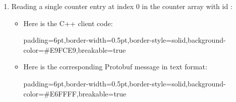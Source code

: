 \documentclass[11pt]{article}
\begin{document}
{%
\begin{enumerate}%

\item{}
Reading a single counter entry at index 0 in the counter array with id
:%

\begin{itemize}[noitemsep,topsep=\mdcompacttopsep]%

\item{}Here is the C++ client code:

\begin{mdbmargintb}{6pt}{6pt}%
\begin{mdblock}{padding=6pt,border-width=0.5pt,border-style=solid,background-color=\#E9FCE9,breakable=true}%
\begin{mdpre}%
\end{mdpre}%
\end{mdblock}%
\end{mdbmargintb}%

\item{}Here is the corresponding Protobuf message in text format:

\begin{mdbmargintb}{6pt}{6pt}%
\begin{mdblock}{padding=6pt,border-width=0.5pt,border-style=solid,background-color=\#E6FFFF,breakable=true}%
\begin{mdpre}%
\end{mdpre}%
\end{mdblock}%
\end{mdbmargintb}%


\end{itemize}
\end{enumerate}}
\end{document}
